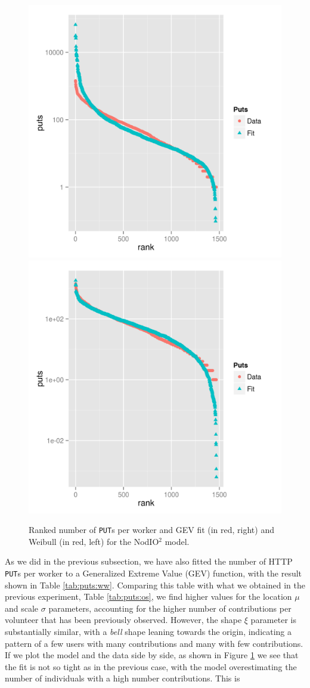 \documentclass[journal,onecolumn]{IEEEtran}
\begin{document}
\begin{figure}[!htb]
\centering
\includegraphics[width=0.49\linewidth]{gev-fit-ww.png}
\includegraphics[width=0.49\linewidth]{weibull-fit-ww.png}
\caption{Ranked number of {\tt PUT}s per worker and GEV fit (in red, right) and Weibull (in red, left) for the {\sf NodIO$^2$} model.}  
\label{fig:gev:w2}
\end{figure}
%
As we did in the previous subsection, we have also fitted the number
of HTTP {\tt PUT}s per worker to a  Generalized Extreme Value (GEV) function, with the result shown
in Table \ref{tab:puts:ww}. Comparing this table with what we obtained
in the previous experiment, Table \ref{tab:puts:os}, we find higher values
for the location $\mu$ and scale $\sigma$ parameters, accounting for
the higher number of contributions per volunteer that has been
previously observed. However, the shape $\xi$ parameter is
substantially similar, with a {\em bell} shape leaning towards the
origin, indicating a pattern of a few users with many contributions
and many with few contributions. If we plot the model and the data
side by side, as shown in Figure \ref{fig:gev:w2} we see that the fit
is not so tight as in the previous case, with the model overestimating
the number of individuals with a high number contributions. This is
\end{document}
